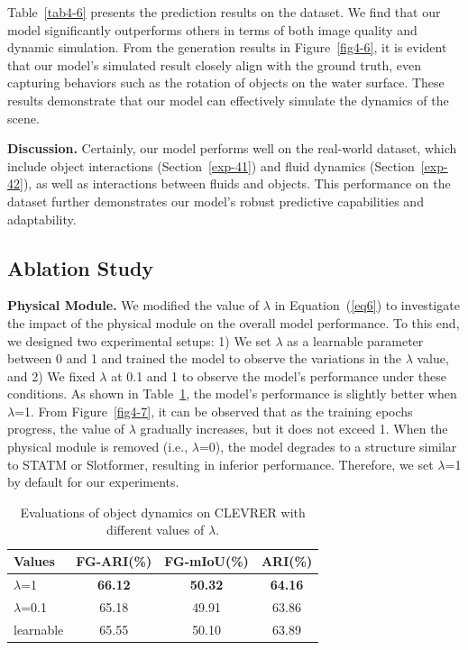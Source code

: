 \documentclass[sigconf]{acmart}
\begin{document}
Table~\ref{tab4-6} presents the prediction results on the dataset. We find that our model significantly outperforms others in terms of both image quality and dynamic simulation. From the generation results in Figure~\ref{fig4-6}, it is evident that our model's simulated result closely align with the ground truth, even capturing behaviors such as the rotation of objects on the water surface. These results demonstrate that our model can effectively simulate the dynamics of the scene.

\textbf{Discussion.} Certainly, our model performs well on the real-world dataset, which include object interactions (Section~\ref{exp-41}) and fluid dynamics (Section~\ref{exp-42}), as well as interactions between fluids and objects. This performance on the dataset further demonstrates our model's robust predictive capabilities and adaptability.



\subsection{Ablation Study}
\label{exp-44}

\textbf{Physical Module.} We modified the value of $\lambda$ in Equation~(\ref{eq6}) to investigate the impact of the physical module on the overall model performance. To this end, we designed two experimental setups: 1) We set $\lambda$ as a learnable parameter between 0 and 1 and trained the model to observe the variations in the $\lambda$ value, and 2) We fixed $\lambda$ at 0.1 and 1 to observe the model's performance under these conditions. As shown in Table~\ref{tab4-7}, the model's performance is slightly better when $\lambda$=1. From Figure~\ref{fig4-7}, it can be observed that as the training epochs progress, the value of $\lambda$ gradually increases, but it does not exceed 1. When the physical module is removed (i.e., $\lambda$=0), the model degrades to a structure similar to STATM or Slotformer, resulting in inferior performance. Therefore, we set $\lambda$=1 by default for our experiments.

\begin{table}[t!]
\caption{Evaluations of object dynamics on CLEVRER with different values of $\lambda$.}
\label{tab4-7}
\vspace{-6pt}
\begin{tabular}{lccc}
\toprule
{\bf Values}&\small {\bf FG-ARI}\textsf{(\%)}&\small {\bf FG-mIoU}\textsf{(\%)}&\small {\bf ARI}\textsf{(\%)}\\
\midrule
$\lambda$=1&\textbf{66.12}&\textbf{50.32}&\textbf{64.16}\\
$\lambda$=0.1&65.18&49.91&63.86\\
learnable&65.55&50.10&63.89\\
\bottomrule
\end{tabular}
\vspace{-6pt}
\end{table}
\end{document}
